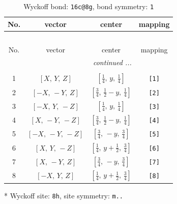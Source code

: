 \documentclass[fleqn,8pt]{jsarticle}
\begin{document}
\renewcommand{\arraystretch}{1.2}
\begin{longtable}{cccc}
\caption{Wyckoff bond: {\tt 16c@8g}, bond symmetry: {\tt 1}}
 \\
 \hline \hline
No. & vector & center & mapping \\ \hline \endfirsthead

\multicolumn{3}{l}{\tablename\ \thetable{}} \\
 \hline \hline
No. & vector & center & mapping \\ \hline \endhead

 \hline \hline
\multicolumn{3}{r}{\footnotesize\it continued ...} \\ \endfoot

 \hline \hline
\multicolumn{3}{r}{} \\ \endlastfoot

1 & $\left[ X,\, Y,\, Z \right]$ & $\left[ \frac{1}{4},\, y,\, \frac{1}{4} \right]$ & {\tt [1]} \\ \hline
2 & $\left[ - X,\, - Y,\, Z \right]$ & $\left[ \frac{3}{4},\, \frac{1}{2} - y,\, \frac{1}{4} \right]$ & {\tt [2]} \\ \hline
3 & $\left[ - X,\, Y,\, - Z \right]$ & $\left[ \frac{1}{4},\, y,\, \frac{1}{4} \right]$ & {\tt [3]} \\ \hline
4 & $\left[ X,\, - Y,\, - Z \right]$ & $\left[ \frac{3}{4},\, \frac{1}{2} - y,\, \frac{1}{4} \right]$ & {\tt [4]} \\ \hline
5 & $\left[ - X,\, - Y,\, - Z \right]$ & $\left[ \frac{3}{4},\, - y,\, \frac{3}{4} \right]$ & {\tt [5]} \\ \hline
6 & $\left[ X,\, Y,\, - Z \right]$ & $\left[ \frac{1}{4},\, y + \frac{1}{2},\, \frac{3}{4} \right]$ & {\tt [6]} \\ \hline
7 & $\left[ X,\, - Y,\, Z \right]$ & $\left[ \frac{3}{4},\, - y,\, \frac{3}{4} \right]$ & {\tt [7]} \\ \hline
8 & $\left[ - X,\, Y,\, Z \right]$ & $\left[ \frac{1}{4},\, y + \frac{1}{2},\, \frac{3}{4} \right]$ & {\tt [8]} \\
\end{longtable}
* Wyckoff site: {\tt 8h}, site symmetry: {\tt m..}
\renewcommand{\arraystretch}{1.2}
\end{document}
